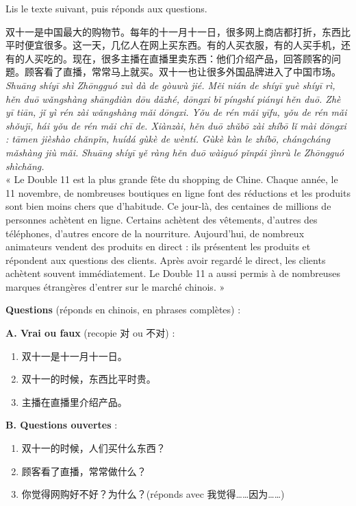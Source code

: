 \documentclass[11pt]{article}
\newcounter{popsec}
\newcounter{popsub}
\newcommand{\courssub}[1]{%
  \stepcounter{popsub}%
  \par\vspace{9pt}\noindent{\popxbold\fontsize{11.5}{13}\selectfont\color{popink}{\color{poporange}\thepopsec.\thepopsub}\hspace{6pt}#1}\par\nopagebreak\vspace{4pt}
}
\begin{document}
\courssub{Je me prépare au Bac}

\begin{exercice}
Lis le texte suivant, puis réponds aux questions.

\begin{textebox}[双十一]
双十一是中国最大的购物节。每年的十一月十一日，很多网上商店都打折，东西比平时便宜很多。这一天，几亿人在网上买东西。有的人买衣服，有的人买手机，还有的人买吃的。现在，很多主播在直播里卖东西：他们介绍产品，回答顾客的问题。顾客看了直播，常常马上就买。双十一也让很多外国品牌进入了中国市场。\\
\textit{Shuāng shíyī shì Zhōngguó zuì dà de gòuwù jié. Měi nián de shíyī yuè shíyī rì, hěn duō wǎngshàng shāngdiàn dōu dǎzhé, dōngxi bǐ píngshí piányi hěn duō. Zhè yī tiān, jǐ yì rén zài wǎngshàng mǎi dōngxi. Yǒu de rén mǎi yīfu, yǒu de rén mǎi shǒujī, hái yǒu de rén mǎi chī de. Xiànzài, hěn duō zhǔbō zài zhíbō lǐ mài dōngxi : tāmen jièshào chǎnpǐn, huídá gùkè de wèntí. Gùkè kàn le zhíbō, chángcháng mǎshàng jiù mǎi. Shuāng shíyī yě ràng hěn duō wàiguó pǐnpái jìnrù le Zhōngguó shìchǎng.}\\
« Le Double 11 est la plus grande fête du shopping de Chine. Chaque année, le 11 novembre, de nombreuses boutiques en ligne font des réductions et les produits sont bien moins chers que d'habitude. Ce jour-là, des centaines de millions de personnes achètent en ligne. Certains achètent des vêtements, d'autres des téléphones, d'autres encore de la nourriture. Aujourd'hui, de nombreux animateurs vendent des produits en direct : ils présentent les produits et répondent aux questions des clients. Après avoir regardé le direct, les clients achètent souvent immédiatement. Le Double 11 a aussi permis à de nombreuses marques étrangères d'entrer sur le marché chinois. »
\end{textebox}

\textbf{Questions} (réponds en chinois, en phrases complètes) :

\textbf{A. Vrai ou faux} (recopie 对 ou 不对) :
\begin{enumerate}
\item 双十一是十一月十一日。
\item 双十一的时候，东西比平时贵。
\item 主播在直播里介绍产品。
\end{enumerate}

\textbf{B. Questions ouvertes} :
\begin{enumerate}
\item 双十一的时候，人们买什么东西？
\item 顾客看了直播，常常做什么？
\item 你觉得网购好不好？为什么？(réponds avec 我觉得……因为……)
\end{enumerate}
\end{exercice}
\end{document}
